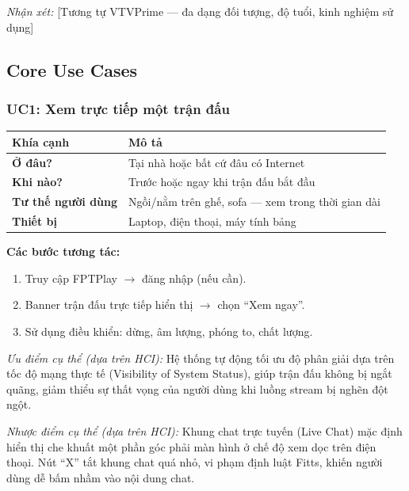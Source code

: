 \medskip\noindent\textit{Nhận xét:} [Tương tự VTVPrime --- đa dạng đối tượng, độ tuổi, kinh nghiệm sử dụng]

\subsection{Core Use Cases}

\subsubsection{UC1: Xem trực tiếp một trận đấu}

\begin{center}
\begin{tabularx}{\textwidth}{|l|X|}
\hline
\textbf{Khía cạnh} & \textbf{Mô tả} \\
\hline
\textbf{Ở đâu?} & Tại nhà hoặc bất cứ đâu có Internet \\
\hline
\textbf{Khi nào?} & Trước hoặc ngay khi trận đấu bắt đầu \\
\hline
\textbf{Tư thế người dùng} & Ngồi/nằm trên ghế, sofa --- xem trong thời gian dài \\
\hline
\textbf{Thiết bị} & Laptop, điện thoại, máy tính bảng \\
\hline
\end{tabularx}
\end{center}

\medskip\noindent\textbf{Các bước tương tác:}
\begin{enumerate}[leftmargin=2em]
  \item Truy cập FPTPlay $\rightarrow$ đăng nhập (nếu cần).
  \item Banner trận đấu trực tiếp hiển thị $\rightarrow$ chọn ``Xem ngay''.
  \item Sử dụng điều khiển: dừng, âm lượng, phóng to, chất lượng.
\end{enumerate}

\medskip\noindent\textit{Ưu điểm cụ thể (dựa trên HCI):} Hệ thống tự động tối ưu độ phân giải dựa trên tốc độ mạng thực tế (Visibility of System Status), giúp trận đấu không bị ngắt quãng, giảm thiểu sự thất vọng của người dùng khi luồng stream bị nghẽn đột ngột.

\medskip\noindent\textit{Nhược điểm cụ thể (dựa trên HCI):} Khung chat trực tuyến (Live Chat) mặc định hiển thị che khuất một phần góc phải màn hình ở chế độ xem dọc trên điện thoại. Nút ``X'' tắt khung chat quá nhỏ, vi phạm định luật Fitts, khiến người dùng dễ bấm nhầm vào nội dung chat.

